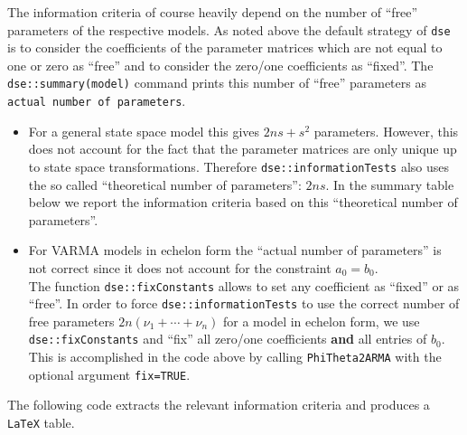 \documentclass[]{article}
\providecommand{\tightlist}{%
  \setlength{\itemsep}{0pt}\setlength{\parskip}{0pt}}
\begin{document}
The information criteria of course heavily depend on the number of
``free'' parameters of the respective models. As noted above the default
strategy of \texttt{dse} is to consider the coefficients of the
parameter matrices which are not equal to one or zero as ``free'' and to
consider the zero/one coefficients as ``fixed''. The
\texttt{dse::summary(model)} command prints this number of ``free''
parameters as \texttt{actual\ number\ of\ parameters}.

\begin{itemize}
\tightlist
\item
  For a general state space model this gives \(2ns+s^2\) parameters.
  However, this does not account for the fact that the parameter
  matrices are only unique up to state space transformations. Therefore
  \texttt{dse::informationTests} also uses the so called ``theoretical
  number of parameters'': \(2ns\). In the summary table below we report
  the information criteria based on this ``theoretical number of
  parameters''.\\
\item
  For VARMA models in echelon form the ``actual number of parameters''
  is not correct since it does not account for the constraint
  \(a_0 = b_0\).\\
  The function \texttt{dse::fixConstants} allows to set any coefficient
  as ``fixed'' or as ``free''. In order to force
  \texttt{dse::informationTests} to use the correct number of free
  parameters \(2n(\nu_1 +\cdots + \nu_n)\) for a model in echelon form,
  we use \texttt{dse::fixConstants} and ``fix'' all zero/one
  coefficients \textbf{and} all entries of \(b_0\). This is accomplished
  in the code above by calling \texttt{PhiTheta2ARMA} with the optional
  argument \texttt{fix=TRUE}.
\end{itemize}

The following code extracts the relevant information criteria and
produces a \texttt{LaTeX} table.
\end{document}
